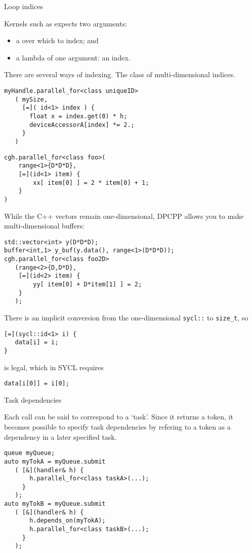  {Loop indices}

Kernels such as 
expects two arguments:
\begin{itemize}
\item a  over which to index; and
\item a lambda of one argument: an index.
\end{itemize}

There are several ways of indexing.
The  class of multi-dimensional indices.
\begin{lstlisting}
myHandle.parallel_for<class uniqueID>
   ( mySize,
     [=]( id<1> index ) {
       float x = index.get(0) * h;
       deviceAccessorA[index] *= 2.;
     }
   )
\end{lstlisting}

\begin{lstlisting}
cgh.parallel_for<class foo>(
    range<1>{D*D*D},
    [=](id<1> item) {
        xx[ item[0] ] = 2 * item[0] + 1;
    }
)
\end{lstlisting}

While the C++ vectors remain one-dimensional,
\ac{DPCPP} allows you to make multi-dimensional buffers:
\begin{lstlisting}
std::vector<int> y(D*D*D);
buffer<int,1> y_buf(y.data(), range<1>(D*D*D));
cgh.parallel_for<class foo2D>
   (range<2>{D,D*D},
    [=](id<2> item) {
        yy[ item[0] + D*item[1] ] = 2;
    }
   );
\end{lstlisting}

\begin{dpcppnote}
  There is an implicit conversion from the one-dimensional
  \lstinline+sycl::+
  to \lstinline+size_t+, so
\begin{lstlisting}
[=](sycl::id<1> i) {
   data[i] = i;
}
\end{lstlisting}
is legal, which in SYCL requires
\begin{lstlisting}
data[i[0]] = i[0];
\end{lstlisting}
\end{dpcppnote}

 {Task dependencies}

Each  call can be said to correspond to a `task'.
Since it returns a token, it becomes possible to specify
task dependencies by refering to a token as a dependency
in a later specified task.
\begin{lstlisting}
queue myQueue;
auto myTokA = myQueue.submit
   ( [&](handler& h) {
       h.parallel_for<class taskA>(...);
     }
   );
auto myTokB = myQueue.submit
   ( [&](handler& h) {
       h.depends_on(myTokA);
       h.parallel_for<class taskB>(...);
     }
   );
\end{lstlisting}

